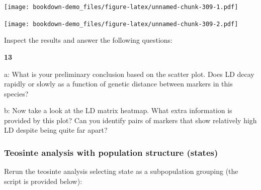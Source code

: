 \documentclass[
]{book}
\makeatletter
\newenvironment{Shaded}{\begin{snugshade}}{\end{snugshade}}
\newcommand{\AttributeTok}[1]{\textcolor[rgb]{0.77,0.63,0.00}{#1}}
\newcommand{\DecValTok}[1]{\textcolor[rgb]{0.00,0.00,0.81}{#1}}
\newcommand{\FloatTok}[1]{\textcolor[rgb]{0.00,0.00,0.81}{#1}}
\newcommand{\FunctionTok}[1]{\textcolor[rgb]{0.00,0.00,0.00}{#1}}
\newcommand{\NormalTok}[1]{#1}
\newcommand{\OtherTok}[1]{\textcolor[rgb]{0.56,0.35,0.01}{#1}}
\newcommand{\SpecialCharTok}[1]{\textcolor[rgb]{0.00,0.00,0.00}{#1}}
\newcommand{\StringTok}[1]{\textcolor[rgb]{0.31,0.60,0.02}{#1}}
\newenvironment{kframe}{%
\medskip{}
\setlength{\fboxsep}{.8em}
 \def\at@end@of@kframe{}%
 \ifinner\ifhmode%
  \def\at@end@of@kframe{\end{minipage}}%
  \begin{minipage}{\columnwidth}%
 \fi\fi%
 \def\FrameCommand##1{\hskip\@totalleftmargin \hskip-\fboxsep
 \colorbox{shadecolor}{##1}\hskip-\fboxsep
     \hskip-\linewidth \hskip-\@totalleftmargin \hskip\columnwidth}%
 \MakeFramed {\advance\hsize-\width
   \@totalleftmargin\z@ \linewidth\hsize
   \@setminipage}}%
 {\par\unskip\endMakeFramed%
 \at@end@of@kframe}
\newenvironment{rmdblock}[1]
  {
  \begin{itemize}
  \renewcommand{\labelitemi}{
    \raisebox{-.7\height}[0pt][0pt]{
      {\setkeys{Gin}{width=3em,keepaspectratio}\texttt{[image: images/\#1]}}
    }
  }
  \setlength{\fboxsep}{1em}
  \begin{kframe}
  \item
  }
  {
  \end{kframe}
  \end{itemize}
  }
\newenvironment{rmdquiz}
  {\begin{rmdblock}{quiz}}
  {\end{rmdblock}}
\makeatother
\begin{document}
\texttt{[image: bookdown-demo\_files/figure-latex/unnamed-chunk-309-1.pdf]}

\begin{Shaded}
\end{Shaded}

\texttt{[image: bookdown-demo\_files/figure-latex/unnamed-chunk-309-2.pdf]}

Inspect the results and answer the following questions:

\begin{rmdquiz}
\textbf{13}

a: What is your preliminary conclusion based on the scatter plot. Does LD decay rapidly or slowly as a function of genetic distance between markers in this species?

b: Now take a look at the LD matrix heatmap. What extra information is provided by this plot? Can you identify pairs of markers that show relatively high LD despite being quite far apart?
\end{rmdquiz}

\hypertarget{teosinte-analysis-with-population-structure-states}{%
\subsubsection{Teosinte analysis with population structure (states)}\label{teosinte-analysis-with-population-structure-states}}

Rerun the teosinte analysis selecting state as a subpopulation grouping (the script is provided below):
\end{document}

